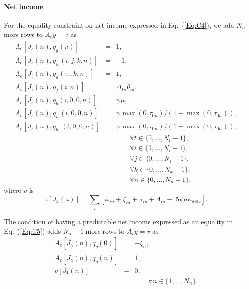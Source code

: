 \documentclass{article}[fleqn,12pt]
\begin{document}
\paragraph*{Net income}
For the equality constraint on net income expressed in Eq.~(\ref{Eq:C4}),
we add $N_n$ more rows to $A_ey = v$ as
\begin{eqnarray}
	A_e[J_3(n), q_g(n)] &=& 1, \nonumber \\
	A_e[J_3(n), q_w(i, j ,k, n)] &=& -1,\nonumber \\
	A_e[J_3(n), q_d(i, ,k, n)] &=& 1, \nonumber \\
	A_e[J_3(n), q_f(t, n)] &=& \bar\Delta_{t n}\theta_{t n}, \nonumber \\
	A_e[J_3(n), q_b(i, 0, 0, n)] &=& \psi\mu, \nonumber \\
	A_e[J_3(n), q_w(i, 0, 0, n)] &=& \psi\max(0, \tau_{0n})/(1+\max(0, \tau_{0n})), \nonumber \\
	A_e[J_3(n), q_{b^-}(i, 0, 0, n)] &=& \psi\max(0, \tau_{0n})/(1+\max(0, \tau_{0n})), \\
	&&\qquad\forall t \in \{0,\ldots, N_t-1\},\nonumber\\
	&&\qquad\forall i \in \{0,\ldots, N_i-1\},\nonumber\\
	&&\qquad\forall j \in \{0,\ldots, N_j-1\},\nonumber\\
	&&\qquad\forall k \in \{0,\ldots, N_k-1\},\nonumber\\
	&&\qquad\forall n \in \{0,\ldots, N_n-1\}, \nonumber
\end{eqnarray}
where $v$ is
\begin{equation}
	v[J_3(n)] = \sum_i [\omega_{in} + \bar\zeta_{in} + \pi_{in}
	+ \Lambda_{in} - .5\psi\mu\kappa_{i00n}].
\end{equation}

The condition of having a predictable net income expressed as an
equality in Eq.~(\ref{Eq:C5}) adds $N_n-1$ more rows to $A_ey = v$ as
\begin{eqnarray}
	A_e[J_4(n), q_g(0)] &=& -\bar{\xi}_n, \nonumber \\
	A_e[J_4(n), q_g(n)] &=& 1, \nonumber \\
	v[J_4(n)] &=& 0, \\
	&&\qquad\forall n \in \{1,\ldots, N_n\}. \nonumber
\end{eqnarray}
\end{document}
